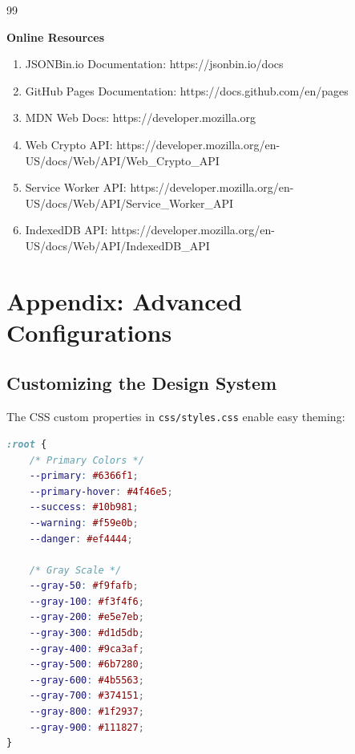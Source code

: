 \documentclass[12pt,a4paper]{report}
\begin{document}
\begin{thebibliography}{99}




\Large
\textbf{Online Resources}

\begin{enumerate}
    \item JSONBin.io Documentation: https://jsonbin.io/docs
    \item GitHub Pages Documentation: https://docs.github.com/en/pages
    \item MDN Web Docs: https://developer.mozilla.org
    \item Web Crypto API: https://developer.mozilla.org/en-US/docs/Web/API/Web\_Crypto\_API
    \item Service Worker API: https://developer.mozilla.org/en-US/docs/Web/API/Service\_Worker\_API
    \item IndexedDB API: https://developer.mozilla.org/en-US/docs/Web/API/IndexedDB\_API
\end{enumerate}

\end{thebibliography}

\cleardoublepage

\appendix
\chapter{Appendix: Advanced Configurations}
\thispagestyle{fancy}
\label{app:advanced}

\section{Customizing the Design System}
\label{app:design}

The CSS custom properties in \texttt{css/styles.css} enable easy theming:

\begin{lstlisting}[language=CSS, caption={CSS Custom Properties Configuration}, label={lst:css-vars}]
:root {
    /* Primary Colors */
    --primary: #6366f1;
    --primary-hover: #4f46e5;
    --success: #10b981;
    --warning: #f59e0b;
    --danger: #ef4444;
    
    /* Gray Scale */
    --gray-50: #f9fafb;
    --gray-100: #f3f4f6;
    --gray-200: #e5e7eb;
    --gray-300: #d1d5db;
    --gray-400: #9ca3af;
    --gray-500: #6b7280;
    --gray-600: #4b5563;
    --gray-700: #374151;
    --gray-800: #1f2937;
    --gray-900: #111827;
}
\end{lstlisting}
\end{document}
